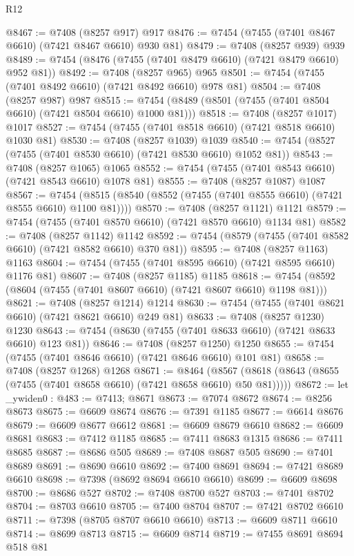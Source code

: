\begin{lexlean}{R12}
\begin{coremodule}
{{{{{{{{{{{{{{{{{{{{{{{{{{{{{{{{{{{{{{{{{{{{{{{{{{{{{{{{{{{{{{{{{{{{{{{{{{{{{{{{{{@8467 := @7408 (@8257 @917) @917
@8476 := @7454 (@7455 (@7401 @8467 @6610) (@7421 @8467 @6610) @930 @81)
@8479 := @7408 (@8257 @939) @939
@8489 := @7454 (@8476 (@7455 (@7401 @8479 @6610) (@7421 @8479 @6610) @952 @81))
@8492 := @7408 (@8257 @965) @965
@8501 := @7454 (@7455 (@7401 @8492 @6610) (@7421 @8492 @6610) @978 @81)
@8504 := @7408 (@8257 @987) @987
@8515 := @7454 (@8489 (@8501 (@7455 (@7401 @8504 @6610) (@7421 @8504 @6610) @1000 @81)))
@8518 := @7408 (@8257 @1017) @1017
@8527 := @7454 (@7455 (@7401 @8518 @6610) (@7421 @8518 @6610) @1030 @81)
@8530 := @7408 (@8257 @1039) @1039
@8540 := @7454 (@8527 (@7455 (@7401 @8530 @6610) (@7421 @8530 @6610) @1052 @81))
@8543 := @7408 (@8257 @1065) @1065
@8552 := @7454 (@7455 (@7401 @8543 @6610) (@7421 @8543 @6610) @1078 @81)
@8555 := @7408 (@8257 @1087) @1087
@8567 := @7454 (@8515 (@8540 (@8552 (@7455 (@7401 @8555 @6610) (@7421 @8555 @6610) @1100 @81))))
@8570 := @7408 (@8257 @1121) @1121
@8579 := @7454 (@7455 (@7401 @8570 @6610) (@7421 @8570 @6610) @1134 @81)
@8582 := @7408 (@8257 @1142) @1142
@8592 := @7454 (@8579 (@7455 (@7401 @8582 @6610) (@7421 @8582 @6610) @370 @81))
@8595 := @7408 (@8257 @1163) @1163
@8604 := @7454 (@7455 (@7401 @8595 @6610) (@7421 @8595 @6610) @1176 @81)
@8607 := @7408 (@8257 @1185) @1185
@8618 := @7454 (@8592 (@8604 (@7455 (@7401 @8607 @6610) (@7421 @8607 @6610) @1198 @81)))
@8621 := @7408 (@8257 @1214) @1214
@8630 := @7454 (@7455 (@7401 @8621 @6610) (@7421 @8621 @6610) @249 @81)
@8633 := @7408 (@8257 @1230) @1230
@8643 := @7454 (@8630 (@7455 (@7401 @8633 @6610) (@7421 @8633 @6610) @123 @81))
@8646 := @7408 (@8257 @1250) @1250
@8655 := @7454 (@7455 (@7401 @8646 @6610) (@7421 @8646 @6610) @101 @81)
@8658 := @7408 (@8257 @1268) @1268
@8671 := @8464
    (@8567 (@8618 (@8643 (@8655 (@7455 (@7401 @8658 @6610) (@7421 @8658 @6610) @50 @81)))))
@8672 := let _ywiden0 : @483 := @7413; @8671
@8673 := @7074 @8672
@8674 := @8256 @8673
@8675 := @6609 @8674
@8676 := @7391 @1185
@8677 := @6614 @8676
@8679 := @6609 @8677 @6612
@8681 := @6609 @8679 @6610
@8682 := @6609 @8681
@8683 := @7412 @1185
@8685 := @7411 @8683 @1315
@8686 := @7411 @8685
@8687 := @8686 @505
@8689 := @7408 @8687 @505
@8690 := @7401 @8689
@8691 := @8690 @6610
@8692 := @7400 @8691
@8694 := @7421 @8689 @6610
@8698 := @7398 (@8692 @8694 @6610 @6610)
@8699 := @6609 @8698
@8700 := @8686 @527
@8702 := @7408 @8700 @527
@8703 := @7401 @8702
@8704 := @8703 @6610
@8705 := @7400 @8704
@8707 := @7421 @8702 @6610
@8711 := @7398 (@8705 @8707 @6610 @6610)
@8713 := @6609 @8711 @6610
@8714 := @8699 @8713
@8715 := @6609 @8714
@8719 := @7455 @8691 @8694 @518 @81
}}}}}}}}}}}}}}}}}}}}}}}}}}}}}}}}}}}}}}}}}}}}}}}}}}}}}}}}}}}}}}}}}}}}}}}}}}}}}}}}}}
\end{coremodule}
\end{lexlean}
